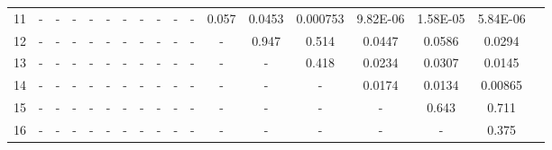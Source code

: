 \documentclass[10pt,letterpaper]{article}
\begin{document}
\begin{table}[hbt!]
{\begin{tabular}{ |l|c|c|c|c|c|c|c|c|c|c|c|c|c|c|c|c|c| }
11 & -      & -      & -      & -      & -      & -      & -      & -      & -      & -        & 0.057   & 0.0453 & 0.000753 & 9.82E-06 & 1.58E-05 & 5.84E-06 \\
12 & -      & -      & -      & -      & -      & -      & -      & -      & -      & -        & -       & 0.947  & 0.514   & 0.0447  & 0.0586  & 0.0294 \\
13 & -      & -      & -      & -      & -      & -      & -      & -      & -      & -        & -       & -      & 0.418   & 0.0234  & 0.0307  & 0.0145 \\
14 & -      & -      & -      & -      & -      & -      & -      & -      & -      & -        & -       & -      & -       & 0.0174  & 0.0134  & 0.00865 \\
15 & -      & -      & -      & -      & -      & -      & -      & -      & -      & -        & -       & -      & -       & -       & 0.643   & 0.711 \\
16 & -      & -      & -      & -      & -      & -      & -      & -      & -      & -        & -       & -      & -       & -       & -       & 0.375 \\

\end{tabular}
}
\label{table5c}
\end{table}
\end{document}
